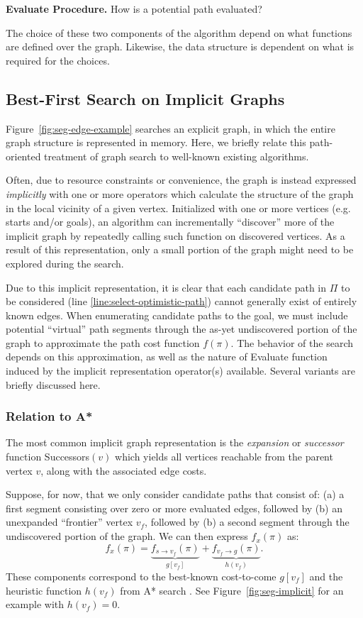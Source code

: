 \documentclass{report}
\begin{document}
\textbf{{\sc Evaluate} Procedure.}
How is a potential path evaluated?

The choice of these two components of the algorithm depend on what
functions are defined over the graph.
Likewise, the data structure is dependent on what is required
for the choices.

\subsection{Best-First Search on Implicit Graphs}
\label{sec:implicit}

Figure~\ref{fig:seg-edge-example} searches an explicit graph,
in which the entire graph structure is represented in memory.
Here, we briefly relate this path-oriented treatment of graph search
to well-known existing algorithms.

Often, due to resource constraints or convenience,
the graph is instead expressed \emph{implicitly}
with one or more operators which calculate the structure of the graph
in the local vicinity of a given vertex.
Initialized with one or more vertices (e.g. starts and/or goals),
an algorithm can incrementally ``discover'' more of the implicit
graph by repeatedly calling such function on discovered vertices.
As a result of this representation,
only a small portion of the graph might need to be explored
during the search.

Due to this implicit representation,
it is clear that each candidate path in $\Pi$ to be considered
(line \ref{line:select-optimistic-path})
cannot generally exist of entirely known edges.
When enumerating candidate paths to the goal,
we must include potential ``virtual'' path segments
through the as-yet undiscovered portion of the graph
to approximate the path cost function $f(\pi)$.
The behavior of the search depends on this approximation,
as well as the nature of {\sc Evaluate} function induced by
the implicit representation operator(s) available.
Several variants are briefly discussed here.

\subsubsection{Relation to A*}

The most common implicit graph representation
is the \emph{expansion} or \emph{successor} function {\sc Successors}$(v)$
which yields all vertices reachable from the parent vertex $v$,
along with the associated edge costs.

Suppose, for now, that we only consider candidate paths that consist of:
(a) a first segment consisting over zero or more evaluated edges,
followed by
(b) an unexpanded ``frontier'' vertex $v_f$, followed by
(b) a second segment through the undiscovered portion of the graph.
We can then express $f_x(\pi)$ as:
\begin{equation}
   f_x(\pi)
   = \underbrace{f_{s \rightarrow v_f}(\pi)}_{g[v_f]}
   + \underbrace{f_{v_f \rightarrow g}(\pi)}_{h(v_f)}.
\end{equation}
These components correspond to the best-known cost-to-come $g[v_f]$
and the heuristic function $h(v_f)$ from A* search \cite{hart1968astar}.
See Figure~\ref{fig:seg-implicit} for an example with $h(v_f)=0$.
\end{document}
